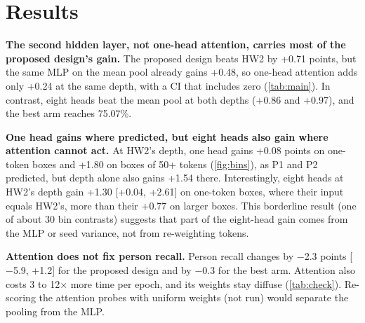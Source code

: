 \documentclass{article} %
\newcommand{\ci}[2]{{\scriptsize[#1, #2]}}
\begin{document}
\section{Results}
\label{sec:results}



\textbf{The second hidden layer, not one-head attention, carries most of the proposed design's gain.}
The proposed design beats HW2 by +0.71 points, but the same MLP on the mean pool already gains +0.48, so one-head attention adds only +0.24 at the same depth, with a CI that includes zero (\cref{tab:main}).
In contrast, eight heads beat the mean pool at both depths (+0.86 and +0.97), and the best arm reaches 75.07\%.

\textbf{One head gains where predicted, but eight heads also gain where attention cannot act.}
At HW2's depth, one head gains +0.08 points on one-token boxes and +1.80 on boxes of 50+ tokens (\cref{fig:bins}), as P1 and P2 predicted, but depth alone also gains +1.54 there.
Interestingly, eight heads at HW2's depth gain +1.30 \ci{+0.04}{+2.61} on one-token boxes, where their input equals HW2's, more than their +0.77 on larger boxes.
This borderline result (one of about 30 bin contrasts) suggests that part of the eight-head gain comes from the MLP or seed variance, not from re-weighting tokens.

\textbf{Attention does not fix person recall.}
Person recall changes by $-$2.3 points \ci{$-$5.9}{+1.2} for the proposed design and by $-$0.3 for the best arm.
Attention also costs 3 to 12$\times$ more time per epoch, and its weights stay diffuse (\cref{tab:check}).
Re-scoring the attention probes with uniform weights (not run) would separate the pooling from the MLP.
\end{document}
